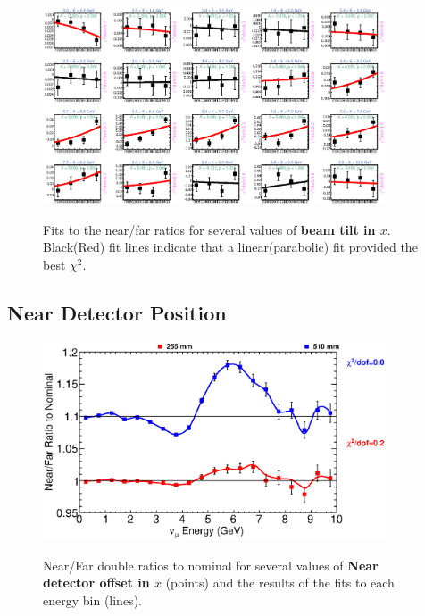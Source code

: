 \begin{figure}[hb]
  \begin{center}
    {\includegraphics[width=4.0in]{figures/Tilt_t_nof_fits.eps}}
  \end{center}
\caption{ Fits to the near/far ratios for several values of {\bf beam tilt in $x$}. Black(Red) fit lines indicate that a linear(parabolic) fit provided the best $\chi^2$. }
\end{figure}

\clearpage
\subsection{Near Detector Position}

\begin{figure}[ht]
  \begin{center}
    {\includegraphics[width=4.0in]{figures/LBNENDX_nof_summary.eps}}
  \end{center}
\caption{ Near/Far double ratios to nominal for several values of {\bf Near detector offset in $x$} (points) and the results of the fits to each energy bin (lines).}
\end{figure}

